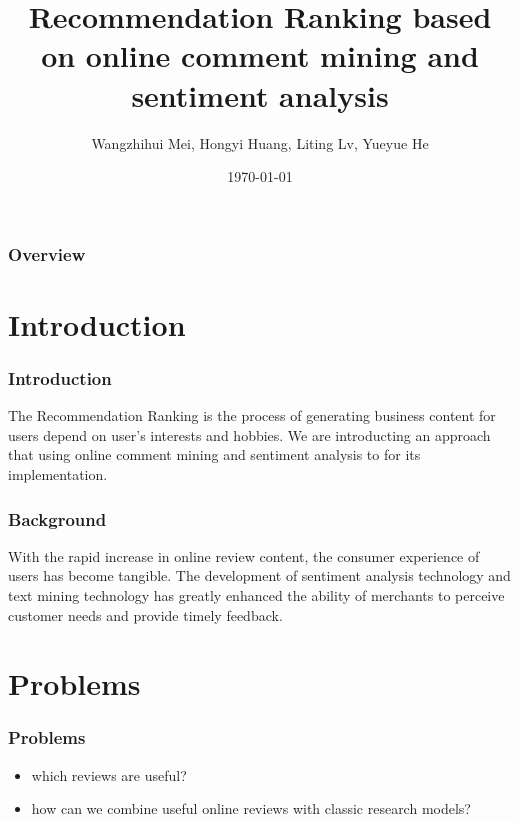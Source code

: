 \documentclass{beamer}
\title[GAI based on ML]{Recommendation Ranking based on online comment mining and sentiment analysis} %
\author{ Wangzhihui Mei, Hongyi Huang, Liting Lv, Yueyue He} %
\institute[JI] %
{
CCNU-UOW JI \\ %
\medskip
\textit{maywzh@gmail.com} %
}
\date{\today} %
\begin{document}
\begin{frame}
\titlepage %
\end{frame}

\begin{frame}
\frametitle{Overview} %
\tableofcontents %
\end{frame}


\section{Introduction} %

\begin{frame}
\frametitle{Introduction}
The Recommendation Ranking is the process of generating business content for users depend on user's interests and hobbies. We are introducting an approach that using online comment mining and sentiment analysis to for its implementation.
\end{frame}

\begin{frame}
    \frametitle{Background}
    With the rapid increase in online review content, the consumer experience of users has become tangible. The development of sentiment analysis technology and text mining technology has greatly enhanced the ability of merchants to perceive customer needs and provide timely feedback.
\end{frame}

\section{Problems}
\begin{frame}
    \frametitle{Problems}
    \begin{itemize}
        \item which reviews are useful?
        \item how can we combine useful online reviews with classic research models?
    \end{itemize}
\end{frame}
\end{document}
